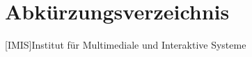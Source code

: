 
\cleardoublepage
{}
{}
\chapter*{Abkürzungsverzeichnis}
\label{section-abbrevs}



\begin{acronym}[CoLab]
  [IMIS]{Institut für Multimediale und Interaktive Systeme}
\end{acronym}
